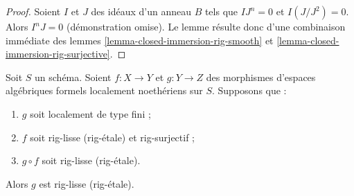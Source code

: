 \begin{proof}
Soient $I$ et $J$ des idéaux d'un anneau $B$ tels que $IJ^n = 0$ et
$I(J/J^2) = 0$. Alors $I^nJ = 0$ (démonstration omise).
Le lemme résulte donc d'une combinaison immédiate des
lemmes \ref{lemma-closed-immersion-rig-smooth} et
\ref{lemma-closed-immersion-rig-surjective}.
\end{proof}

\begin{lemma}
\label{lemma-rig-etale-descent}
Soit $S$ un schéma. Soient $f : X \to Y$ et $g : Y \to Z$
des morphismes d'espaces algébriques formels localement noethériens sur $S$.
Supposons que :
\begin{enumerate}
\item $g$ soit localement de type fini ;
\item $f$ soit rig-lisse (\resp rig-étale) et rig-surjectif ;
\item $g \circ f$ soit rig-lisse (\resp rig-étale).
\end{enumerate}
Alors $g$ est rig-lisse (\resp rig-étale).
\end{lemma}

